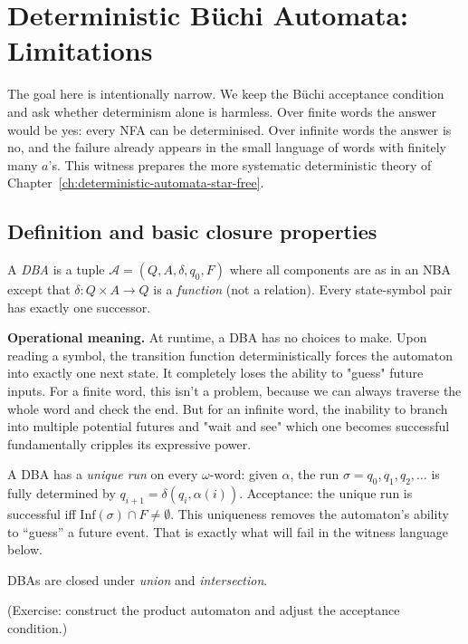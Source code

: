 \section{Deterministic Büchi Automata: Limitations}
\label{sec:dba}

The goal here is intentionally narrow.  We keep the Büchi acceptance
condition and ask whether determinism alone is harmless.  Over finite
words the answer would be yes: every NFA can be determinised.  Over
infinite words the answer is no, and the failure already appears in the
small language of words with finitely many $a$'s.  This witness prepares
the more systematic deterministic theory of
Chapter~\ref{ch:deterministic-automata-star-free}.

\subsection{Definition and basic closure properties}

\begin{definition}
A \emph{DBA} is a tuple $\mathcal{A} = (Q, A, \delta, q_0, F)$ where
all components are as in an NBA except that $\delta : Q \times A \to Q$
is a \emph{function} (not a relation).  Every state-symbol pair has
exactly one successor.
\end{definition}

\medskip\noindent
\textbf{Operational meaning.}  At runtime, a DBA has no choices to make. Upon reading a symbol, the transition function deterministically forces the automaton into exactly one next state. It completely loses the ability to "guess" future inputs. For a finite word, this isn't a problem, because we can always traverse the whole word and check the end. But for an infinite word, the inability to branch into multiple potential futures and "wait and see" which one becomes successful fundamentally cripples its expressive power.

A DBA has a \emph{unique run} on every $\omega$-word: given $\alpha$,
the run $\sigma = q_0, q_1, q_2, \ldots$ is fully determined by
$q_{i+1} = \delta(q_i, \alpha(i))$.  Acceptance: the unique run is
successful iff $\mathrm{Inf}(\sigma) \cap F \neq \emptyset$.
This uniqueness removes the automaton's ability to ``guess'' a future
event.  That is exactly what will fail in the witness language below.

\begin{proposition}
DBAs are closed under \emph{union} and \emph{intersection}.
\end{proposition}
(Exercise: construct the product automaton and adjust the acceptance condition.)


